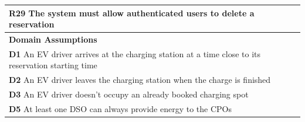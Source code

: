 \begin{table}[H]
\begin{tabularx}{\textwidth}{X}
        \textbf{R29} The system must allow authenticated users to delete a reservation                                               \\ \midrule
        \textbf{Domain Assumptions}                                                                                                  \\ \midrule
        \textbf{D1} An EV driver arrives at the charging station at a time close to its reservation starting time                    \\
        \textbf{D2} An EV driver leaves the charging station when the charge is finished                                             \\
        \textbf{D3} An EV driver doesn't occupy an already booked charging spot                                                      \\
        \textbf{D5} At least one DSO can always provide energy to the CPOs                                                           \\ \bottomrule
    \end{tabularx}
\end{table}
